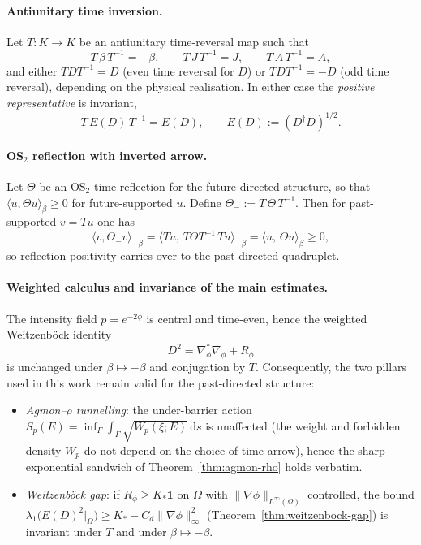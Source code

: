 \documentclass[11pt]{article}
\theoremstyle{definition}
\begin{document}
    \paragraph{Antiunitary time inversion.}
    Let $T:K\to K$ be an antiunitary time-reversal map such that
    \[
    T\,\beta\,T^{-1}=-\beta,\qquad T\,J\,T^{-1}=J,\qquad T\,A\,T^{-1}=A,
    \]
    and either $TDT^{-1}=D$ (even time reversal for $D$) or $TDT^{-1}=-D$ (odd time reversal), depending on the physical realisation.
    In either case the \emph{positive representative} is invariant,
    \[
    T\,E(D)\,T^{-1}=E(D),\qquad E(D):=(D^\dagger D)^{1/2}.
    \]
    
    \paragraph{OS$_2$ reflection with inverted arrow.}
    Let $\Theta$ be an OS$_2$ time-reflection for the future-directed structure, so that
    $\langle u,\Theta u\rangle_\beta\ge 0$ for future-supported $u$.
    Define $\Theta_-:=T\,\Theta\,T^{-1}$. Then for past-supported $v=T u$ one has
    \[
    \langle v,\Theta_- v\rangle_{-\beta}=\langle Tu,\,T\Theta T^{-1}\,Tu\rangle_{-\beta}
    =\langle u,\,\Theta u\rangle_{\beta}\ge 0,
    \]
    so reflection positivity carries over to the past-directed quadruplet.
    
    \paragraph{Weighted calculus and invariance of the main estimates.}
    The intensity field $p = e^{-2\phi}$ is central and time-even, hence the weighted Weitzenböck identity
    \[
    D^2=\nabla_\phi^\ast\nabla_\phi+R_\phi
    \]
    is unchanged under $\beta\mapsto-\beta$ and conjugation by $T$.
    Consequently, the two pillars used in this work remain valid for the past-directed structure:
    \begin{itemize}
    	\item \emph{Agmon--$\rho$ tunnelling}: the under-barrier action
    	$S_p(E)=\inf_\Gamma\int_\Gamma\!\sqrt{W_p(\xi;E)}\,\mathrm{d}s$ 
    	is unaffected (the weight and forbidden density $W_p$ do not depend on the choice of time arrow), hence the sharp exponential sandwich of Theorem~\ref{thm:agmon-rho} holds verbatim.
    	\item \emph{Weitzenböck gap}: if $R_\phi\ge K_\ast\mathbf{1}$ on $\Omega$ with $\|\nabla\phi\|_{L^\infty(\Omega)}$ controlled, the bound
    	$\lambda_1\!\big(E(D)^2\!\vert_\Omega\big)\ge K_\ast-C_d\|\nabla\phi\|^2_\infty$
    	(Theorem~\ref{thm:weitzenbock-gap}) is invariant under $T$ and under $\beta\mapsto-\beta$.
    \end{itemize}
    
\end{document}
